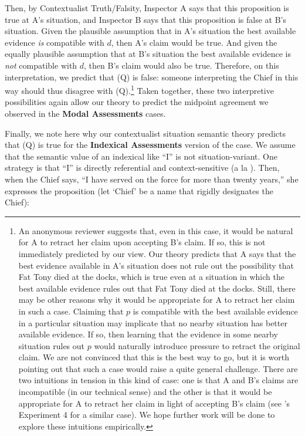 \documentclass[11pt]{article}
\begin{document}
\begin{doublespace}
Then, by {\sc Contextualist Truth/Falsity}, Inspector A says that this proposition is true at A's situation, and Inspector B says that this proposition is false at B's situation. Given the plausible assumption that in A's situation the best available evidence {\it is} compatible with $d$, then A's claim would be true. And given the equally plausible assumption that at B's situation the best available evidence is {\it not} compatible with $d$, then B's claim would also be true. Therefore, on this interpretation, we predict that (Q) is false: someone interpreting the Chief in this way should thus disagree with (Q).\footnote{An anonymous reviewer suggests that, even in this case, it would be natural for A to retract her claim upon accepting B's claim. If so, this is not immediately predicted by our view. Our theory predicts that A says that the best evidence available in A's situation does not rule out the possibility that Fat Tony died at the docks, which is true even at a situation in which the best available evidence rules out that Fat Tony died at the docks. Still, there may be other reasons why it would be appropriate for A to retract her claim in such a case. Claiming that $p$ is compatible with the best available evidence in a particular situation may implicate that no nearby situation has better available evidence. If so, then learning that the evidence in some nearby situation rules out $p$ would naturally introduce pressure to retract the original claim. We are not convinced that this is the best way to go, but it is worth pointing out that such a case would raise a quite general challenge. There are two intuitions in tension in this kind of case: one is that A and B's claims are incompatible (in our technical sense) and the other is that it would be appropriate for A to retract her claim in light of accepting B's claim (see \cite{yalcinknobe:2014}'s Experiment 4 for a similar case). We hope further work will be done to explore these intuitions empirically.} Taken together, these two interpretive possibilities again allow our theory to predict the midpoint agreement we observed in the \textbf{Modal Assessments} cases.

Finally, we note here why our contextualist situation semantic theory predicts that (Q) is true for the {\bf Indexical Assessments} version of the case. We assume that the semantic value of an indexical like ``I'' is not situation-variant. One strategy is that ``I'' is directly referential and context-sensitive (a la \cite{kaplan:1989}). Then, when the Chief says, ``I have served on the force for more than twenty years,'' she expresses the proposition (let `Chief' be a name that rigidly designates the Chief):%


\end{doublespace}
\end{document}
